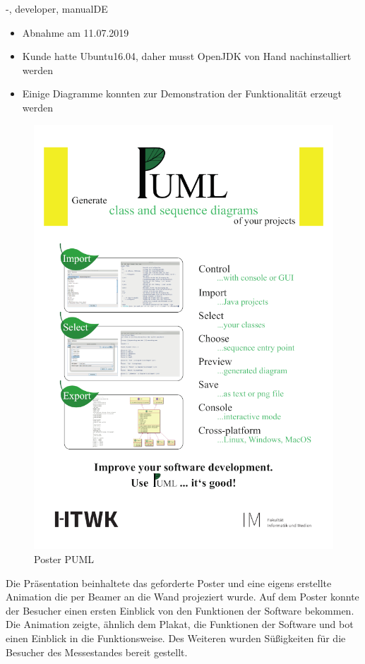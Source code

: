 \documentclass[twoside]{report}
\begin{document}
\begin{shownto}{-, developer, manualDE}

\begin{itemize}
\item Abnahme am 11.07.2019
\item Kunde hatte Ubuntu16.04, daher musst OpenJDK von Hand nachinstalliert werden
\item Einige Diagramme konnten zur Demonstration der Funktionalität erzeugt werden
\end{itemize}
\nsecend

\begin{figure}[H]
	\centering
	\includegraphics{Bilder/Puml_Plakat.png}
	\caption{Poster PUML}
	\label{img:Poster}
\end{figure}

Die Präsentation beinhaltete das geforderte Poster und eine eigens erstellte Animation die per Beamer an die Wand projeziert wurde. Auf dem Poster konnte der Besucher einen ersten Einblick von den Funktionen der Software bekommen. Die Animation zeigte, ähnlich dem Plakat, die Funktionen der Software und bot einen Einblick in die Funktionsweise.
Des Weiteren wurden Süßigkeiten für die Besucher des Messestandes bereit gestellt.
\nsecend


\end{shownto}
\end{document}
